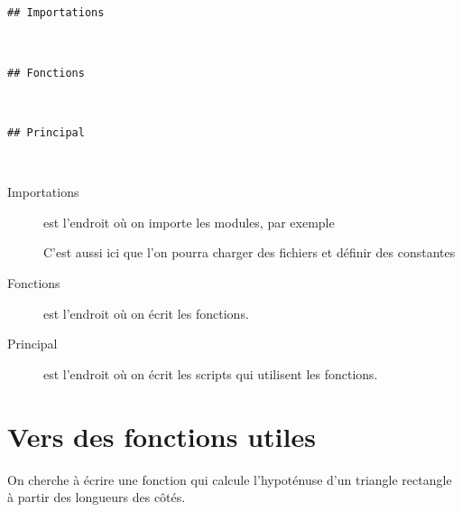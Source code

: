 \begin{lstlisting}
## Importations



## Fonctions



## Principal



\end{lstlisting}
\begin{description}
  \item[Importations] est l'endroit où on importe les modules, par exemple

C'est aussi ici que l'on pourra charger des fichiers et définir des constantes

  \item[Fonctions] est l'endroit où on écrit les fonctions.
  
  \item[Principal] est l'endroit où on écrit les scripts qui utilisent les fonctions.
\end{description}
\section{Vers des fonctions utiles} 
On cherche à écrire une fonction qui calcule l’hypoténuse d'un triangle rectangle à partir des longueurs des côtés.
\begin{center}
\end{center}
